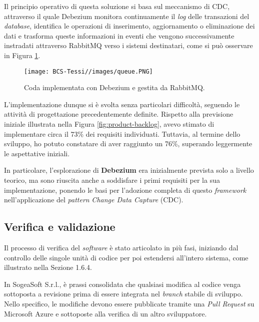         \vspace{0.2 em}
        \noindent Il principio operativo di questa soluzione si basa sul meccanismo di CDC, attraverso il quale Debezium monitora continuamente il \textit{log} delle transazioni del \textit{database}, identifica le operazioni di inserimento, aggiornamento o eliminazione dei dati e trasforma queste informazioni in eventi che vengono successivamente instradati attraverso RabbitMQ verso i sistemi destinatari, come si può osservare in Figura \ref{fig:queue}.

        \begin{figure}[H]
            \centering
            \texttt{[image: BCS-Tessi//images/queue.PNG]}
            \caption{Coda implementata con Debezium e gestita da RabbitMQ.}
            \label{fig:queue}
        \end{figure}

        \noindent L'implementazione dunque si è svolta senza particolari difficoltà, seguendo le attività di progettazione precedentemente definite. Rispetto alla previsione iniziale illustrata nella Figura \ref{fig:product-backlog}, avevo stimato di implementare circa il 73\% dei requisiti individuati. Tuttavia, al termine dello sviluppo, ho potuto constatare di aver raggiunto un 76\%, superando leggermente le aspettative iniziali.  

        In particolare, l'esplorazione di \textbf{Debezium} era inizialmente prevista solo a livello teorico, ma sono riuscita anche a soddisfare i primi requisiti per la sua implementazione, ponendo le basi per l'adozione completa di questo \textit{framework} nell'applicazione del \textit{pattern} \textit{Change Data Capture} (CDC). 

        
        \subsection{Verifica e validazione}
        Il processo di verifica del \textit{software} è stato articolato in più fasi, iniziando dal controllo delle singole unità di codice per poi estendersi all’intero sistema, come illustrato nella Sezione 1.6.4.  

        \vspace{0.2 em}
        \noindent In SogeaSoft S.r.l., è prassi consolidata che qualsiasi modifica al codice venga sottoposta a revisione prima di essere integrata nel \textit{branch} stabile di sviluppo. Nello specifico, le modifiche devono essere pubblicate tramite una \textit{Pull Request} su Microsoft Azure e sottoposte alla verifica di un altro sviluppatore.

